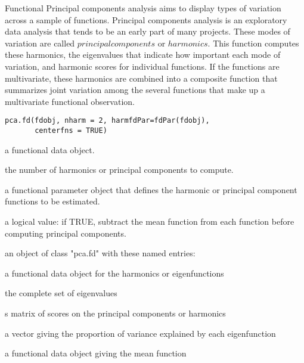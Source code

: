 \begin{Description}\relax
Functional Principal components analysis aims to display types of
variation across a sample of functions.  Principal components analysis
is an exploratory data analysis that tends to be an early part of many
projects.  These modes of variation are called $principal components$
or $harmonics.$  This function computes these harmonics, the
eigenvalues that indicate how important each mode of variation, and
harmonic scores for individual functions. If the functions are
multivariate, these harmonics are combined into a composite function
that summarizes joint variation among the several functions that make
up a multivariate functional observation.
\end{Description}
\begin{Usage}
\begin{verbatim}
pca.fd(fdobj, nharm = 2, harmfdPar=fdPar(fdobj),
       centerfns = TRUE)
\end{verbatim}
\end{Usage}
\begin{Arguments}
\begin{ldescription}
\item[\code{fdobj}] a functional data object.

\item[\code{nharm}] the number of harmonics or principal components to compute.

\item[\code{harmfdPar}] a functional parameter object that defines the
harmonic or principal component functions to be estimated.

\item[\code{centerfns}] a logical value:
if TRUE, subtract the mean function from each function before
computing principal components.

\end{ldescription}
\end{Arguments}
\begin{Value}
an object of class "pca.fd" with these named entries:

\begin{ldescription}
\item[\code{harmonics}] a functional data object for the harmonics or eigenfunctions

\item[\code{values}] the complete set of eigenvalues

\item[\code{scores}] s matrix of scores on the principal components or harmonics

\item[\code{varprop}] a vector giving the proportion of variance explained
by each eigenfunction

\item[\code{meanfd}] a functional data object giving the mean function

\end{ldescription}
\end{Value}
